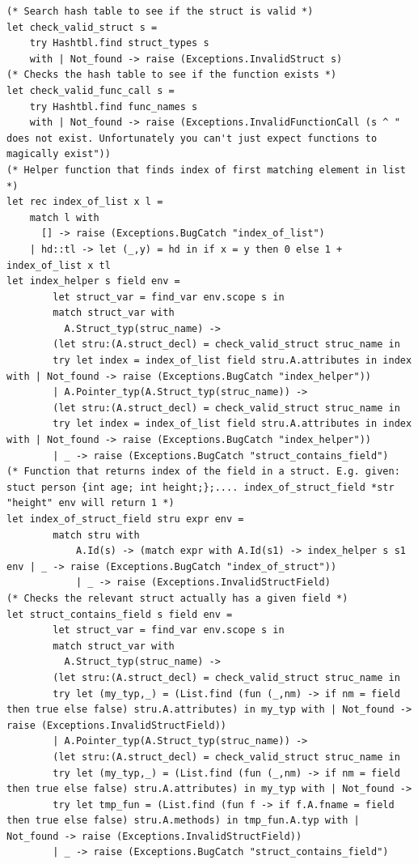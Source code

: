 \documentclass{article}
\begin{document}
\begin{lstlisting}
(* Search hash table to see if the struct is valid *)
let check_valid_struct s =
	try Hashtbl.find struct_types s
	with | Not_found -> raise (Exceptions.InvalidStruct s)
(* Checks the hash table to see if the function exists *)
let check_valid_func_call s = 
	try Hashtbl.find func_names s
	with | Not_found -> raise (Exceptions.InvalidFunctionCall (s ^ " does not exist. Unfortunately you can't just expect functions to magically exist"))
(* Helper function that finds index of first matching element in list *)
let rec index_of_list x l = 
	match l with
	  [] -> raise (Exceptions.BugCatch "index_of_list")
	| hd::tl -> let (_,y) = hd in if x = y then 0 else 1 + index_of_list x tl
let index_helper s field env = 
		let struct_var = find_var env.scope s in 
		match struct_var with 
		  A.Struct_typ(struc_name) ->
		(let stru:(A.struct_decl) = check_valid_struct struc_name in 
		try let index = index_of_list field stru.A.attributes in index with | Not_found -> raise (Exceptions.BugCatch "index_helper"))
		| A.Pointer_typ(A.Struct_typ(struc_name)) ->
		(let stru:(A.struct_decl) = check_valid_struct struc_name in 
		try let index = index_of_list field stru.A.attributes in index with | Not_found -> raise (Exceptions.BugCatch "index_helper"))
		| _ -> raise (Exceptions.BugCatch "struct_contains_field")
(* Function that returns index of the field in a struct. E.g. given: stuct person {int age; int height;};.... index_of_struct_field *str "height" env will return 1 *)
let index_of_struct_field stru expr env = 	
		match stru with
	  		A.Id(s) -> (match expr with A.Id(s1) -> index_helper s s1 env | _ -> raise (Exceptions.BugCatch "index_of_struct")) 
			| _ -> raise (Exceptions.InvalidStructField)
(* Checks the relevant struct actually has a given field *)
let struct_contains_field s field env = 
		let struct_var = find_var env.scope s in 
		match struct_var with 
		  A.Struct_typ(struc_name) ->
		(let stru:(A.struct_decl) = check_valid_struct struc_name in 
		try let (my_typ,_) = (List.find (fun (_,nm) -> if nm = field then true else false) stru.A.attributes) in my_typ with | Not_found -> raise (Exceptions.InvalidStructField))
		| A.Pointer_typ(A.Struct_typ(struc_name)) ->
		(let stru:(A.struct_decl) = check_valid_struct struc_name in 
		try let (my_typ,_) = (List.find (fun (_,nm) -> if nm = field then true else false) stru.A.attributes) in my_typ with | Not_found -> 
		try let tmp_fun = (List.find (fun f -> if f.A.fname = field then true else false) stru.A.methods) in tmp_fun.A.typ with | Not_found -> raise (Exceptions.InvalidStructField))
		| _ -> raise (Exceptions.BugCatch "struct_contains_field")

\end{lstlisting}
\end{document}

